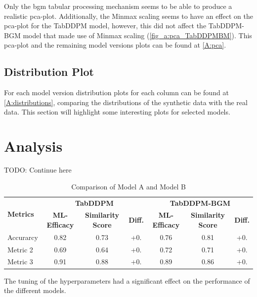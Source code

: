 Only the \gls{bgm} tabular processing mechanism seems to be able to produce a realistic \gls{pca}-plot.
Additionally, the Minmax scaling seems to have an effect on the \gls{pca}-plot for the TabDDPM model, however,
this did not affect the TabDDPM-BGM model that made use of Minmax scaling (\autoref{fig_a:pca_TabDDPMBM}).
This \gls{pca}-plot and the remaining model versions plots can be found at \autoref{A:pca}.

\subsection[]{Distribution Plot}
\label{ch:results-Distr}

For each model version distribution plots for each column can be found at \autoref{A:distributions}, comparing the distributions of the synthetic data with the real data.
This section will highlight some interesting plots for selected models.



\section{Analysis}
\label{ch:results-analysis}


TODO: Continue here
\begin{table}[h]
	\centering
	\caption{Comparison of Model A and Model B}
	\label{tab:model-comparison}
	\begin{tabular}{|l|ccc|ccc|}
		\toprule
		\multirow{2}{*}{\textbf{Metrics}} & \multicolumn{3}{c|}{\textbf{TabDDPM}} & \multicolumn{3}{c|}{\textbf{TabDDPM-BGM}}                                                                                      \\ \cline{2-7}
		                                  & \textbf{ML-Efficacy}                  & \textbf{Similarity Score}                 & \textbf{Diff.} & \textbf{ML-Efficacy} & \textbf{Similarity Score} & \textbf{Diff.} \\
		\midrule
		\multicolumn{1}{|l|}{Accurarcy}   & 0.82                                  & 0.73                                      & +0.            & 0.76                 & 0.81                      & +0.            \\
		\multicolumn{1}{|l|}{Metric 2}    & 0.69                                  & 0.64                                      & +0.            & 0.72                 & 0.71                      & +0.            \\
		\multicolumn{1}{|l|}{Metric 3}    & 0.91                                  & 0.88                                      & +0.            & 0.89                 & 0.86                      & +0.            \\
		\bottomrule
	\end{tabular}
\end{table}



The tuning of the hyperparameters had a significant effect on the performance of the different models.

